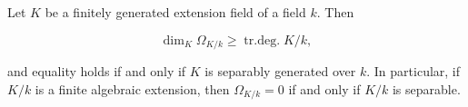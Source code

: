 Let $K$ be a finitely generated extension field of a field $k$. Then

$$\dim_K \Omega_{K/k} \geqslant \operatorname{tr.deg.} K/k,$$

and equality holds if and only if $K$ is separably generated over $k$. In particular, if $K/k$ is a finite algebraic extension, then $\Omega_{K/k} = 0$ if and only if $K/k$ is separable.
